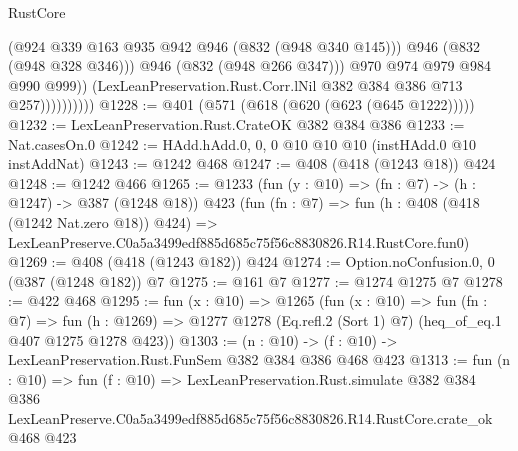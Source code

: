 \begin{lexlean}{RustCore}
\begin{coremodule}
                              (@924 @339 @163 @935 @942 @946 (@832 (@948 @340 @145)))
                              @946
                              (@832 (@948 @328 @346)))
                            @946
                            (@832 (@948 @266 @347)))
                          @970
                          @974
                          @979
                          @984
                          @990
                          @999))
                      (LexLeanPreservation.Rust.Corr.lNil @382 @384 @386 @713 @257))))))))))
@1228 := @401 (@571 (@618 (@620 (@623 (@645 @1222)))))
@1232 := LexLeanPreservation.Rust.CrateOK @382 @384 @386
@1233 := Nat.casesOn.{0}
@1242 := HAdd.hAdd.{0, 0, 0} @10 @10 @10 (instHAdd.{0} @10 instAddNat)
@1243 := @1242 @468
@1247 := @408 (@418 (@1243 @18)) @424
@1248 := @1242 @466
@1265 := @1233
    (fun (y : @10) => (fn : @7) -> (h : @1247) -> @387 (@1248 @18))
    @423
    (fun (fn : @7) =>
    fun (h : @408 (@418 (@1242 Nat.zero @18)) @424) =>
    LexLeanPreserve.C0a5a3499edf885d685c75f56c8830826.R14.RustCore.fun0)
@1269 := @408 (@418 (@1243 @182)) @424
@1274 := Option.noConfusion.{0, 0} (@387 (@1248 @182)) @7
@1275 := @161 @7
@1277 := @1274 @1275 @7
@1278 := @422 @468
@1295 := fun (x : @10) =>
  @1265
    (fun (x : @10) =>
    fun (fn : @7) =>
    fun (h : @1269) => @1277 @1278 (Eq.refl.{2} (Sort 1) @7) (heq_of_eq.{1} @407 @1275 @1278 @423))
@1303 := (n : @10) -> (f : @10) -> LexLeanPreservation.Rust.FunSem @382 @384 @386 @468 @423
@1313 := fun (n : @10) =>
  fun (f : @10) =>
  LexLeanPreservation.Rust.simulate
    @382
    @384
    @386
    LexLeanPreserve.C0a5a3499edf885d685c75f56c8830826.R14.RustCore.crate_ok
    @468
    @423
\end{coremodule}
\end{lexlean}
